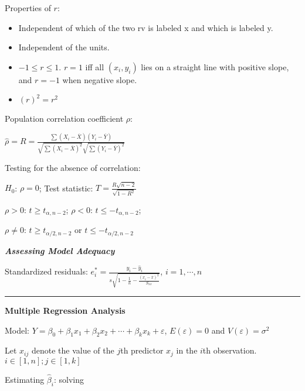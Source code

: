 \documentclass{article}
\newcommand{\sectionline}{\color{black}\rule[2pt]{0.45\textwidth}{0.05em}\color{black}}
\newcommand{\bigtitle}[1]{
	\noindent
	\textbf{#1}
}
\newcommand{\smalltitle}[1]{
	\noindent
	\textbf{\textit{#1}}
}
\begin{document}
	Properties of $r$: 
	
	\begin{itemize}
	\item Independent of which of the two rv is labeled x and which is labeled y.
	
	\item Independent of the units.
	
	\item $- 1 \leq r \leq 1$. $r=1$ iff all $(x_i,y_i)$ lies on a straight line with positive slope, and $r=-1$ when negative slope. 
	
	\item $(r)^2 = r^2$
	\end{itemize}
	
	Population correlation coefficient $\rho$:
	
	$\hat { \rho } = R = \frac { \sum \left( X _ { i } - \overline { X } \right) \left( Y _ { i } - \overline { Y } \right) } { \sqrt { \sum \left( X _ { i } - \overline { X } \right) ^ { 2 } } \sqrt { \sum \left( Y _ { i } - \overline { Y } \right) ^ { 2 } } }$
	
	Testing for the absence of correlation: 
	
	$H_0$: $\rho =0$; Test statistic: $T = \frac { R \sqrt { n - 2 } } { \sqrt { 1 - R ^ { 2 } } }$
	
	$\rho > 0$: $t \geq t _ { \alpha , n - 2 }$; $\rho<0$: $t \leq - t _ { \alpha , n - 2 }$;
	
	$\rho \neq 0$: $t \geq t _ { \alpha / 2 , n - 2 }$ or $t \leq - t _ { \alpha / 2 , n - 2 }$
	
	\smalltitle{Assessing Model Adequacy}
	
	Standardized residuals: $e _ { i } ^ { * } = \frac { y _ { i } - \hat { y } _ { i } } { s \sqrt { 1 - \frac { 1 } { n } - \frac { \left( x _ { i } - \overline { x } \right) ^ { 2 } } { S _ { x x } } } }$, $i = 1,\cdots, n$
	
	\sectionline
	
	\bigtitle{Multiple Regression Analysis}
	
	Model: $Y = \beta _ { 0 } + \beta _ { 1 } x _ { 1 } + \beta _ { 2 } x _ { 2 } + \cdots + \beta _ { k } x _ { k } + \varepsilon$, $E ( \varepsilon ) = 0$ and $V ( \varepsilon ) = \sigma ^ { 2 }$
	
	Let $x_{ij}$ denote the value of the $j$th predictor $x_j$ in the $i$th observation. $i\in [1,n]; j \in [1,k]$
	
	Estimating $\hat{ \beta }_i$: solving
	
\end{document}
